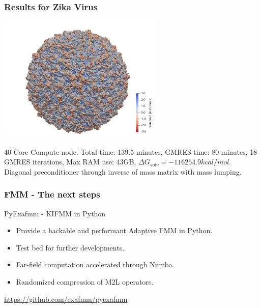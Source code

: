 \documentclass[dvipsnames,10pt]{beamer}
\begin{document}
\begin{frame}
    \frametitle{Results for Zika Virus}

    \begin{center}
        \includegraphics[width=8cm]{../figs/6CO8_potential.png}
    \end{center}

    40 Core Compute node. Total time: 139.5 minutes, GMRES time: 80 minutes, 18 GMRES iterations, Max RAM use: 43GB, $\Delta G_{solv} = -116254.9 kcal/mol$. Diagonal preconditioner through inverse of mass matrix with mass lumping.

\end{frame}

\begin{frame}
    \frametitle{FMM - The next steps}

    {\color{blue} PyExafmm - KIFMM in Python}

    \vspace{\baselineskip}

    \begin{itemize}
        \item Provide a hackable and performant Adaptive FMM in Python.
        \item Test bed for further developments.
        \item Far-field computation accelerated through Numba.
        \item Randomized compression of M2L operators.
    \end{itemize}

    \vspace{\baselineskip}

    {\color{blue}\url{https://github.com/exafmm/pyexafmm}}

\end{frame}
\end{document}
